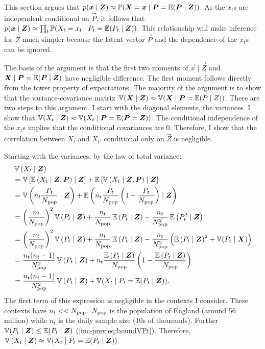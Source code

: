 \documentclass[thesis.tex]{subfiles}
\begin{document}
This section argues that $p(\bm{x} \mid \bm{Z}) \approx \operatorname{\mathbb{P}}(\bm{X} = \bm{x} \mid \bm{P} = \operatorname{\mathbb{E}}(\bm{P} \mid \bm{Z}))$.
As the $x_t$s are independent conditional on $\vec{P}$, it follows that $p(\bm{x} \mid \bm{Z}) \approx \prod_t \operatorname{\mathbb{P}}(X_t = x_t \mid P_t = \operatorname{\mathbb{E}}(P_t \mid \bm{Z}))$.
This relationship will make inference for $\vec{Z}$ much simpler because the latent vector $\vec{P}$ and the dependence of the $x_t$s can be ignored.

The basis of the argument is that the first two moments of $\vec{x} \mid \vec{Z}$ and $\bm{X} \mid \bm{P} = \operatorname{\mathbb{E}}(\bm{P} \mid \bm{Z})$ have negligible difference.
The first moment follows directly from the tower property of expectations.
The majority of the argument is to show that the variance-covariance matrix $\operatorname{\mathbb{V}}(\bm{X} \mid \bm{Z}) \approx \operatorname{\mathbb{V}}(\bm{X} \mid \bm{P} = \operatorname{\mathbb{E}}(P \mid Z))$.
There are two steps to this argument.
I start with the diagonal elements, the variances.
I show that $\operatorname{\mathbb{V}}(X_t \mid \bm{Z}) \approx \operatorname{\mathbb{V}}(X_t \mid \bm{P} = \operatorname{\mathbb{E}}(\bm{P} = \bm{Z}))$.
The conditional independence of the $x_t$s implies that the conditional covariances are 0.
Therefore, I show that the correlation between $X_t$ and $X_{t'}$ conditional only on $\vec{Z}$ is negligible.

Starting with the variances, by the law of total variance:
\begin{align}
  &\operatorname{\mathbb{V}}\left( X_t \mid \bm{Z} \right) \\
    &= \operatorname{\mathbb{V}}\left[\operatorname{\mathbb{E}}\left( X_t \mid \bm{Z}, \bm{P} \right) \mid \bm{Z} \right] + \operatorname{\mathbb{E}}\left[\operatorname{\mathbb{V}}\left( X_t \mid \bm{Z}, \bm{P} \right) \mid \bm{Z} \right] \\
    &= \operatorname{\mathbb{V}}\left( n_t \frac{P_t}{N_\text{pop}} \mid \bm{Z} \right) + \operatorname{\mathbb{E}}\left( n_t \frac{P_t}{N_\text{pop}} \left(1 - \frac{P_t}{N_\text{pop}} \right) \mid \bm{Z} \right) \\
    &= \left( \frac{n_t}{N_\text{pop}} \right)^2 \operatorname{\mathbb{V}}\left(P_t \mid \bm{Z} \right) + \frac{n_t}{N_\text{pop}} \operatorname{\mathbb{E}}\left(P_t \mid \bm{Z} \right)  - \frac{n_t}{N_\text{pop}^2} \operatorname{\mathbb{E}}\left(P_t^2 \mid \bm{Z} \right) \\
    &= \left( \frac{n_t}{N_\text{pop}} \right)^2 \operatorname{\mathbb{V}}\left(P_t \mid \bm{Z} \right) + \frac{n_t}{N_\text{pop}} \operatorname{\mathbb{E}}\left(P_t \mid \bm{Z} \right)  - \frac{n_t}{N_\text{pop}^2} \left(\operatorname{\mathbb{E}}\left(P_t \mid \bm{Z} \right) ^ 2 + \operatorname{\mathbb{V}}(P_t \mid \bm{X})\right) \\
    &= \frac{n_t(n_t - 1)}{N_\text{pop}^2} \operatorname{\mathbb{V}}\left(P_t \mid \bm{Z} \right) + n_t \frac{\operatorname{\mathbb{E}}\left(P_t \mid \bm{Z} \right)}{N_\text{pop}}\left(1 - \frac{\operatorname{\mathbb{E}}\left(P_t \mid \bm{Z} \right)}{N_\text{pop}} \right) \\
    &= \frac{n_t(n_t - 1)}{N_\text{pop}^2} \operatorname{\mathbb{V}}\left(P_t \mid \bm{Z} \right) + \operatorname{\mathbb{V}}(X_t \mid P_t = \operatorname{\mathbb{E}}(P_t \mid \bm{Z})).
\end{align}
The first term of this expression is negligible in the contexts I consider.
These contexts have $n_t << N_\text{pop}$.
$N_\text{pop}$ is the population of England (around 56 million) while $n_t$ is the daily sample size (10s of thousands).
Further $\operatorname{\mathbb{V}}(P_t \mid \bm{Z}) \leq \operatorname{\mathbb{E}}(P_t \mid \bm{Z})$ (\cref{inc-prev:eq:boundVPt}).
Therefore, $\operatorname{\mathbb{V}}\left( X_t \mid \bm{Z} \right) \approx \operatorname{\mathbb{V}}(X_t \mid P_t = \operatorname{\mathbb{E}}(P_t \mid \bm{Z}))$.
\end{document}
